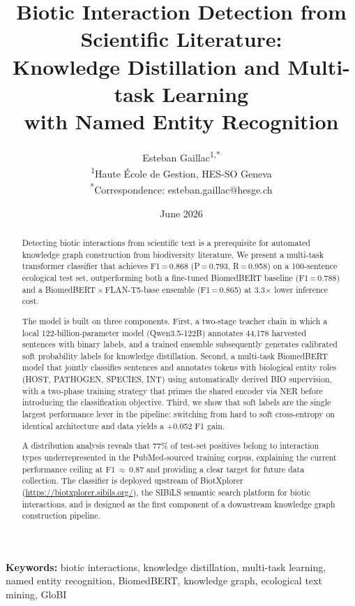 \documentclass[12pt,a4paper]{article}
\title{Biotic Interaction Detection from Scientific Literature:\\
Knowledge Distillation and Multi-task Learning\\
with Named Entity Recognition}
\author{
Esteban Gaillac\textsuperscript{1,*} \\[4pt]
\textsuperscript{1}Haute \'Ecole de Gestion, HES-SO Geneva \\
\textsuperscript{*}Correspondence: esteban.gaillac@hesge.ch
}
\date{June 2026}
\begin{document}
\maketitle

\begin{abstract}
Detecting biotic interactions from scientific text is a prerequisite for
automated knowledge graph construction from biodiversity literature.
We present a multi-task transformer classifier that achieves F1\,=\,0.868
(P\,=\,0.793, R\,=\,0.958) on a 100-sentence ecological test set,
outperforming both a fine-tuned BiomedBERT baseline (F1\,=\,0.788) and
a BiomedBERT\,$\times$\,FLAN-T5-base ensemble (F1\,=\,0.865) at 3.3$\times$
lower inference cost.

The model is built on three components. First, a two-stage teacher chain
in which a local 122-billion-parameter model (Qwen3.5-122B) annotates
44,178 harvested sentences with binary labels, and a trained ensemble
subsequently generates calibrated soft probability labels for knowledge
distillation. Second, a multi-task BiomedBERT model that jointly classifies
sentences and annotates tokens with biological entity roles (HOST, PATHOGEN,
SPECIES, INT) using automatically derived BIO supervision, with a two-phase
training strategy that primes the shared encoder via NER before introducing
the classification objective. Third, we show that soft labels are the single
largest performance lever in the pipeline: switching from hard to soft
cross-entropy on identical architecture and data yields a +0.052 F1 gain.

A distribution analysis reveals that 77\% of test-set positives belong to
interaction types underrepresented in the PubMed-sourced training corpus,
explaining the current performance ceiling at F1\,$\approx$\,0.87 and
providing a clear target for future data collection. The classifier is
deployed upstream of BiotXplorer
(\url{https://biotxplorer.sibils.org/}), the SIBiLS \citep{mottin2021sibils}
semantic search platform for biotic interactions, and is designed as the
first component of a downstream knowledge graph construction pipeline.
\end{abstract}

\textbf{Keywords:} biotic interactions, knowledge distillation, multi-task
learning, named entity recognition, BiomedBERT, knowledge graph,
ecological text mining, GloBI

\end{document}
